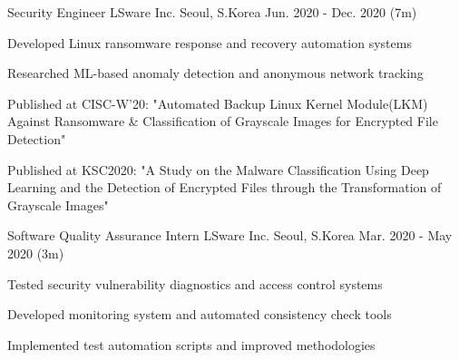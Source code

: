 \begin{cventries}
\cventry
    {Security Engineer} %
    {LSware Inc.} %
    {Seoul, S.Korea} %
    {Jun. 2020 - Dec. 2020 (7m)} %
    {
      \begin{cvitems} %
        \item {Developed Linux ransomware response and recovery automation systems}
        \item {Researched ML-based anomaly detection and anonymous network tracking}
        \item {Published at CISC-W'20: "Automated Backup Linux Kernel Module(LKM) Against Ransomware \& Classification of Grayscale Images for Encrypted File Detection"}
        \item {Published at KSC2020: "A Study on the Malware Classification Using Deep Learning and the Detection of Encrypted Files through the Transformation of Grayscale Images"}
      \end{cvitems}
    }

\cventry
    {Software Quality Assurance Intern} %
    {LSware Inc.} %
    {Seoul, S.Korea} %
    {Mar. 2020 - May 2020 (3m)} %
    {
      \begin{cvitems} %
        \item {Tested security vulnerability diagnostics and access control systems}
        \item {Developed monitoring system and automated consistency check tools}
        \item {Implemented test automation scripts and improved methodologies}
      \end{cvitems}
    }

\end{cventries}